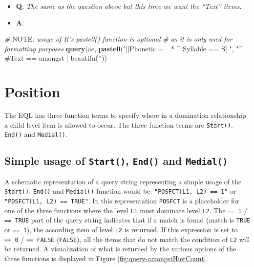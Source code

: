\documentclass[]{book}
\newenvironment{Shaded}{\begin{snugshade}}{\end{snugshade}}
\newcommand{\AlertTok}[1]{\textcolor[rgb]{0.94,0.16,0.16}{#1}}
\newcommand{\CommentTok}[1]{\textcolor[rgb]{0.56,0.35,0.01}{\textit{#1}}}
\newcommand{\KeywordTok}[1]{\textcolor[rgb]{0.13,0.29,0.53}{\textbf{#1}}}
\newcommand{\NormalTok}[1]{#1}
\newcommand{\StringTok}[1]{\textcolor[rgb]{0.31,0.60,0.02}{#1}}
\providecommand{\tightlist}{%
  \setlength{\itemsep}{0pt}\setlength{\parskip}{0pt}}
\begin{document}
\begin{itemize}
\tightlist
\item
  \textbf{Q}: \emph{The same as the question above but this time we want the ``Text'' items.}
\item
  \textbf{A}:
\end{itemize}

\begin{Shaded}
\begin{Highlighting}[]
\CommentTok{# }\AlertTok{NOTE}\CommentTok{: usage of R's paste0() function is optional}
\CommentTok{# as it is only used for formatting purposes}
\KeywordTok{query}\NormalTok{(ae, }\KeywordTok{paste0}\NormalTok{(}\StringTok{"[[Phonetic =~ .* ^ Syllable == S] "}\NormalTok{,}
                 \StringTok{"^ #Text == amongst | beautiful]"}\NormalTok{))}
\end{Highlighting}
\end{Shaded}

\hypertarget{position}{%
\section{Position}\label{position}}

The EQL has three function terms to specify where in a domination relationship a child level item is allowed to occur. The three function terms are \texttt{Start()}, \texttt{End()} and \texttt{Medial()}.

\hypertarget{simple-usage-of-start-end-and-medial}{%
\subsection{\texorpdfstring{Simple usage of \texttt{Start()}, \texttt{End()} and \texttt{Medial()}}{Simple usage of Start(), End() and Medial()}}\label{simple-usage-of-start-end-and-medial}}

A schematic representation of a query string representing a simple usage of the \texttt{Start()}, \texttt{End()} and \texttt{Medial()} function would be: \texttt{"POSFCT(L1,\ L2)\ ==\ 1"} or \texttt{"POSFCT(L1,\ L2)\ ==\ TRUE"}. In this representation \texttt{POSFCT} is a placeholder for one of the three functions where the level \texttt{L1} must dominate level \texttt{L2}. The \texttt{==\ 1} / \texttt{==\ TRUE} part of the query string indicates that if a match is found (match is \texttt{TRUE} or \texttt{==\ 1}), the according item of level \texttt{L2} is returned. If this expression is set to \texttt{==\ 0} / \texttt{==\ FALSE} (\texttt{FALSE}), all the items that do not match the condition of \texttt{L2} will be returned. A visualization of what is returned by the various options of the three functions is displayed in Figure \ref{fig:query-amongstHierCount}.
\end{document}
